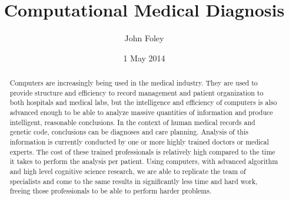 \documentclass[11pt]{article}
\title{Computational Medical Diagnosis}
\author{John Foley}
\date{1 May 2014}
\begin{document}
\maketitle

\thispagestyle{empty}

\begin{abstract}
  Computers are increasingly being used in the medical industry. They are used to provide structure and efficiency to record 
  management and patient organization to both hospitals and medical labs, but the intelligence and efficiency of computers
  is also advanced enough to be able to analyze massive quantities of information and produce intelligent, reasonable
  conclusions. In the context of human medical records and genetic code, conclusions can be diagnoses and care planning. Analysis of this information is
  currently conducted by one or more highly trained doctors or medical experts. The cost of these trained professionals
  is relatively high compared to the time it takes to perform the analysis per patient. Using computers, with advanced
  algorithm and high level cognitive science research, we are able to replicate the team of specialists and come to the same
  results in significantly less time and hard work, freeing those professionals to be able to perform harder problems.
\end{abstract}

\pagebreak
\end{document}
